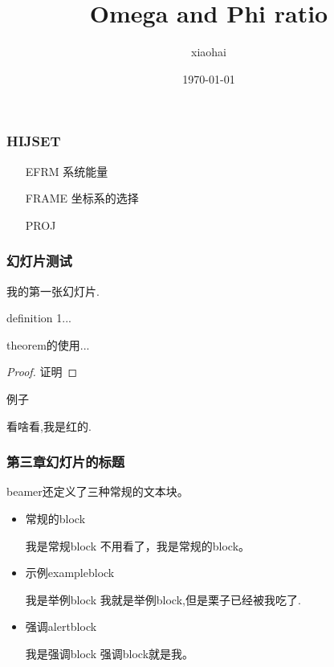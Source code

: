 \documentclass[8pt]{beamer}
\title{Omega and Phi ratio}
\author{xiaohai}
\date{\today}
\begin{document}
\begin{frame}
  \titlepage
\end{frame}


\begin{frame}
  \frametitle{HIJSET}
  \begin{enumerate}
  \item[EFRM] 系统能量
\item [FRAME] 坐标系的选择
\item [PROJ] 
  \end{enumerate}

\end{frame}
\begin{frame}
  \frametitle{{幻灯片测试}} %
  我的第一张幻灯片.
  \begin{definition}
    definition 1...
  \end{definition}

  \begin{theorem}
    theorem的使用...
  \end{theorem}

  \begin{proof}
    证明
  \end{proof}

  \begin{example}
    例子
  \end{example}

  \alert{看啥看,我是红的.}

\end{frame}


\begin{frame}
  \frametitle{第三章幻灯片的标题}

  beamer还定义了三种常规的文本块。
  \begin{itemize}
  \item 常规的block
    \begin{block}{我是常规block}
      不用看了，我是常规的block。
    \end{block}
  \item 示例exampleblock
    \begin{exampleblock}{我是举例block}
      我就是举例block,但是栗子已经被我吃了.
    \end{exampleblock}
  \item 强调alertblock
    \begin{alertblock}{我是强调block}
      强调block就是我。
    \end{alertblock}
  \end{itemize}
  
\end{frame}
\end{document}
